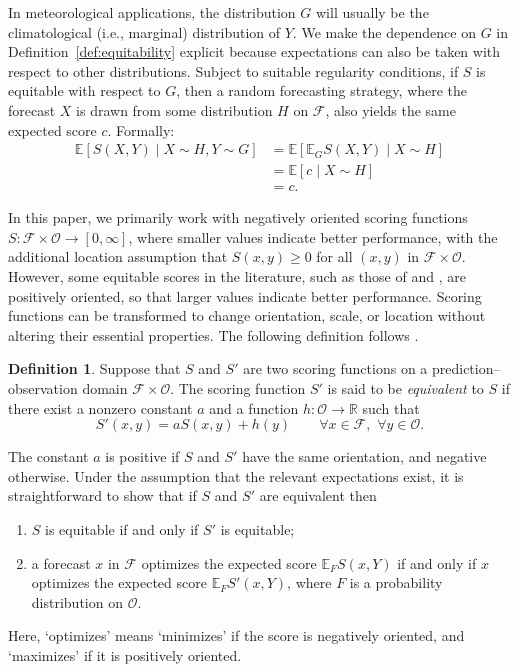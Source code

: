 \documentclass[10pt]{article} %
\theoremstyle{theorem}
\theoremstyle{definition}
\newtheorem{defn}{Definition}
\newcommand{\RRR}{\mathbb{R}}
\newcommand{\EEE}{\mathbb{E}}
\begin{document}
In meteorological applications, the distribution $G$ will usually be the climatological (i.e., marginal) distribution of $Y$. We make the dependence on $G$  in Definition~\ref{def:equitability} explicit because expectations can also be taken with respect to other distributions. Subject to suitable regularity conditions, if $S$ is equitable with respect to $G$, then a random forecasting strategy, where the forecast $X$ is drawn from some distribution $H$ on $\mathcal{F}$, also yields the same expected score $c$. Formally:
\begin{align*}
\EEE[S(X,Y) \mid X \sim H, Y \sim G]
&= \EEE[\EEE_G S(X,Y) \mid X\sim H] \\
&= \EEE[c \mid X \sim H] \\
&= c.
\end{align*}

In this paper, we primarily work with negatively oriented scoring functions $S:\mathcal{F}\times\mathcal{O}\to[0,\infty]$, where smaller values indicate better performance, with the additional location assumption that $S(x,y)\geq0$ for all $(x,y)$ in $\mathcal{F}\times\mathcal{O}$. However, some equitable scores in the literature, such as those of \citet{gandin1992equitable} and \citet{gerrity1992note}, are positively oriented, so that larger values indicate better performance. Scoring functions can be transformed to change orientation, scale, or location without altering their essential properties. The following definition follows \citet{gneiting2007strictly}.

\begin{defn}
Suppose that $S$ and $S'$ are two scoring functions on a prediction--observation domain $\mathcal{F}\times\mathcal{O}$. The scoring function $S'$ is said to be \textit{equivalent} to $S$ if there exist a nonzero constant $a$ and a function $h:\mathcal{O}\to\RRR$ such that
\begin{equation}
S'(x,y)=aS(x,y)+h(y) \qquad \forall x\in \mathcal{F},\,\,\forall y\in \mathcal{O}.
\end{equation}
\end{defn}

The constant $a$ is positive if $S$ and $S'$ have the same orientation, and negative otherwise. Under the assumption that the relevant expectations exist, it is straightforward to show that if $S$ and $S'$ are equivalent then
\begin{enumerate}
\item[(i)] $S$ is equitable if and only if $S'$ is equitable;
\item[(ii)] a forecast $x$ in $\mathcal{F}$ optimizes the expected score $\EEE_FS(x,Y)$ if and only if $x$ optimizes the expected score $\EEE_FS'(x,Y)$, where $F$ is a probability distribution on $\mathcal{O}$.
\end{enumerate}
Here, `optimizes' means `minimizes' if the score is negatively oriented, and `maximizes' if it is positively oriented.
\end{document}
